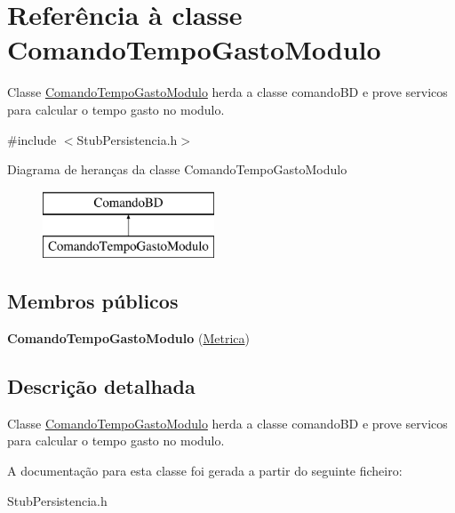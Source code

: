 \hypertarget{class_comando_tempo_gasto_modulo}{
\section{\-Referência à classe \-Comando\-Tempo\-Gasto\-Modulo}
\label{class_comando_tempo_gasto_modulo}
}


\-Classe \hyperlink{class_comando_tempo_gasto_modulo}{\-Comando\-Tempo\-Gasto\-Modulo} herda a classe comando\-B\-D e prove servicos para calcular o tempo gasto no modulo.  




{\ttfamily \#include $<$\-Stub\-Persistencia.\-h$>$}

\-Diagrama de heranças da classe \-Comando\-Tempo\-Gasto\-Modulo\begin{figure}[H]
\begin{center}
\leavevmode
\includegraphics[height=2.000000cm]{class_comando_tempo_gasto_modulo}
\end{center}
\end{figure}
\subsection*{\-Membros públicos}
\begin{DoxyCompactItemize}
\item 
\hypertarget{class_comando_tempo_gasto_modulo_ad950bfb62746e17a717c8337e47e6dac}{
{\bfseries \-Comando\-Tempo\-Gasto\-Modulo} (\hyperlink{class_metrica}{\-Metrica})}
\label{class_comando_tempo_gasto_modulo_ad950bfb62746e17a717c8337e47e6dac}

\end{DoxyCompactItemize}


\subsection{\-Descrição detalhada}
\-Classe \hyperlink{class_comando_tempo_gasto_modulo}{\-Comando\-Tempo\-Gasto\-Modulo} herda a classe comando\-B\-D e prove servicos para calcular o tempo gasto no modulo. 

\-A documentação para esta classe foi gerada a partir do seguinte ficheiro\-:\begin{DoxyCompactItemize}
\item 
\-Stub\-Persistencia.\-h\end{DoxyCompactItemize}
